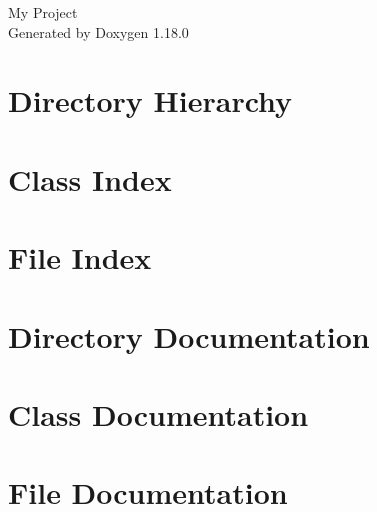 \documentclass[twoside]{book}
\newcommand{\+}{\discretionary{\mbox{\scriptsize$\hookleftarrow$}}{}{}}
\newcommand{\clearemptydoublepage}{%
    \newpage{\pagestyle{empty}\cleardoublepage}%
  }
\begin{document}
  \raggedbottom
    \hypersetup{pageanchor=false,
                bookmarksnumbered=true,
                pdfencoding=unicode
               }
  \begin{titlepage}
  \vspace*{7cm}
  \begin{center}%
  {\Large My Project}\\
  \vspace*{1cm}
  {\large Generated by Doxygen 1.18.0}\\
  \end{center}
  \end{titlepage}
  \clearemptydoublepage
  \tableofcontents
  \clearemptydoublepage
  \hypersetup{pageanchor=true}


\chapter{Directory Hierarchy}

\chapter{Class Index}

\chapter{File Index}

\chapter{Directory Documentation}

\chapter{Class Documentation}





\chapter{File Documentation}















  \backmatter
  \newpage
  \clearemptydoublepage
  \printindex
\end{document}
